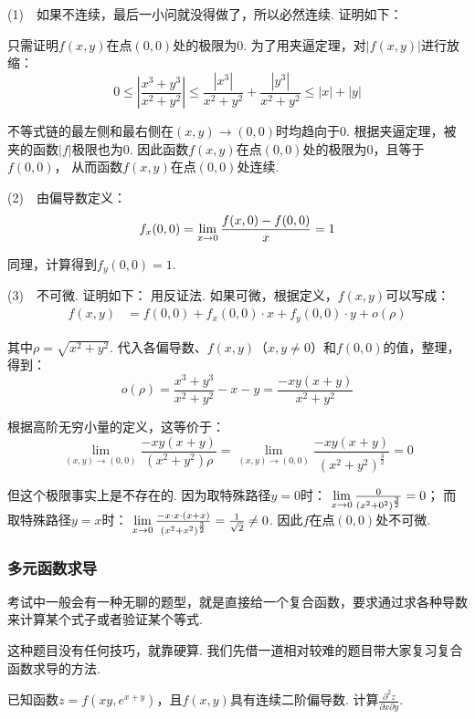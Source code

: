 \begin{solution}
(1)~~如果不连续，最后一小问就没得做了，所以必然连续.
证明如下：

只需证明$f(x,y)$在点$(0,0)$处的极限为$0$.
为了用夹逼定理，对$|f(x,y)|$进行放缩：
$$
0 \le \left| \frac{x^3 + y^3}{x^2 + y^2} \right|
\le \frac{|x^3|}{x^2 + y^2} + \frac{|y^3|}{x^2 + y^2}
\le |x| + |y|
$$

不等式链的最左侧和最右侧在$(x,y) \to (0,0)$时均趋向于$0$.
根据夹逼定理，被夹的函数$|f|$极限也为$0$.
因此函数$f(x,y)$在点$(0,0)$处的极限为$0$，且等于$f(0,0)$，
从而函数$f(x,y)$在点$(0,0)$处连续.

(2)~~由偏导数定义：
$$
f_x(0,0) = \limx0 \frac{f(x,0) - f(0,0)}{x} = 1
$$\par
同理，计算得到$f_y(0,0) = 1$.

(3)~~不可微. 证明如下：
用反证法. 如果可微，根据定义，$f(x,y)$可以写成：
\begin{equation}
    \begin{aligned}
        f(x,y) &= f(0,0) + f_{x}(0,0)\cdot x + f_{y}(0,0)\cdot y + o(\rho)
        \nonumber
    \end{aligned}
\end{equation}

其中$\rho = \sqrt{x^2 + y^2}$. 代入各偏导数、$f(x,y)$（$x,y \ne 0$）和$f(0,0)$的值，整理，得到：
$$
o(\rho) = \frac{x^3 + y^3}{x^2 + y^2} - x - y = \frac{-xy(x+y)}{x^2 + y^2}
$$

根据高阶无穷小量的定义，这等价于：
$$
\lim\limits_{(x,y) \to (0,0)} \frac{-xy(x+y)}{(x^2 + y^2)\rho} =
\lim\limits_{(x,y) \to (0,0)} \frac{-xy(x+y)}{(x^2 + y^2)^\frac{3}{2}} = 0
$$

但这个极限事实上是不存在的. 因为取特殊路径$y=0$时：
$\limx0 \frac{0}{(x^2 + 0^2)^\frac{3}{2}} = 0$；
而取特殊路径$y=x$时：
$\limx0 \frac{-x \cdot x \cdot (x+x)}{(x^2 + x^2)^{\frac{3}{2}}} = \frac{1}{\sqrt{2}} \ne 0$.
因此$f$在点$(0,0)$处不可微.
\end{solution}

\subsubsection{多元函数求导}
考试中一般会有一种无聊的题型，就是直接给一个复合函数，要求通过求各种导数来计算某个式子或者验证某个等式.\par
这种题目没有任何技巧，就靠硬算.
我们先借一道相对较难的题目带大家复习复合函数求导的方法.

\begin{example}
\label{ex:ch06-10}
已知函数$z = f(xy,e^{x+y})$，且$f(x,y)$具有连续二阶偏导数. 计算$\frac{\partial^2 z}{\partial x \partial y}$.
\end{example}

